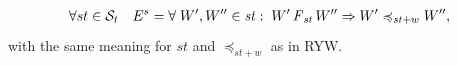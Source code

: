 \documentclass[acmlarge, ,11pt]{acmart}
\begin{document}
  \begin{align}\label{eqn:MW}
\begin{split}
\forall st \in \mathcal{S}_t \quad E^{s} = \forall \; {W}', {W}'' \in \mathit{st} : \; {W}' \operatorname{\it F}_\mathit{st} {W}''  \Rightarrow {W}' \preccurlyeq_{\mathit{st}+w} {W}'' , %
\end{split}
  \end{align} with the same meaning for $\mathit{st}$ and $\preccurlyeq_{\mathit{st}+w}$ as in RYW.
\end{document}
